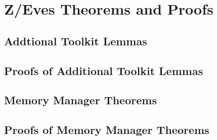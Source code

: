 \documentclass[a4paper,10pt]{report}
\begin{document}
{\raggedright \printbibliography}

\appendix

\chapter{Z/Eves Theorems and Proofs}

\section{Addtional Toolkit Lemmas}
\label{additional-lemmas}
\normalsize


\section{Proofs of Additional Toolkit Lemmas}
\label{additional-lemmas-proofs}
\scriptsize




\section{Memory Manager Theorems}
\label{memory-manager-theorems}
\normalsize


\section{Proofs of Memory Manager Theorems}
\label{memory-manager-proofs}
\scriptsize

\end{document}
